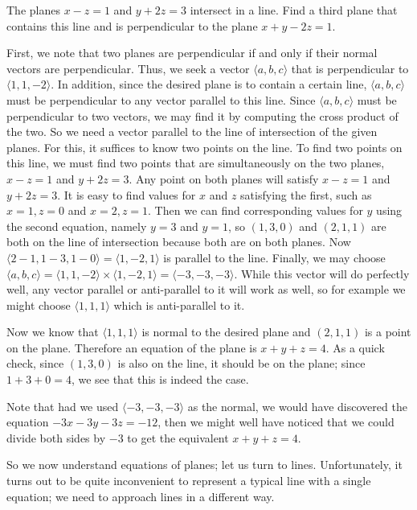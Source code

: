 \begin{example} The planes $x-z=1$ and $y+2z=3$ intersect in a line. Find a
third plane that contains this line and is perpendicular to the plane
$x+y-2z=1$. 

First, we note that two planes are perpendicular if and only if their
normal vectors are perpendicular. Thus, we seek a vector $\langle
a,b,c\rangle$ that is
perpendicular to $\langle 1,1,-2\rangle$. In addition, since the
desired plane is to contain a certain line, $\langle
a,b,c\rangle$ must be perpendicular to any vector parallel to this
line. Since $\langle
a,b,c\rangle$ must be perpendicular to two vectors, we may find it by
computing the cross product of the two. So we need a vector parallel
to the line of intersection of the given planes. For this, it suffices
to know two points on the line. To find two points on this line, we
must find two points that are simultaneously on the two planes, 
$x-z=1$ and $y+2z=3$. Any point on both planes will satisfy 
$x-z=1$ and $y+2z=3$. It is easy to find values for $x$ and $z$
satisfying the first, such as $x=1, z=0$ and $x=2, z=1$. Then
we can find corresponding values for $y$ using the second equation,
namely $y=3$ and $y=1$, so
$(1,3,0)$ and $(2,1,1)$ are both on the line
of intersection because both are on both planes. Now 
$\langle 2-1,1-3,1-0\rangle=\langle 1,-2,1\rangle$ is parallel to the
line. Finally, we may choose $\langle a,b,c\rangle=\langle
1,1,-2\rangle\times \langle 1,-2,1\rangle=\langle -3,-3,-3\rangle$.
While this vector will do perfectly well, any vector parallel or
anti-parallel to it will work as well, so for example we might choose
$\langle 1,1,1\rangle$ which is anti-parallel to it. 

Now we know that $\langle 1,1,1\rangle$ is normal to the desired plane
and $(2,1,1)$ is a point on the plane. Therefore an equation of the
plane is $x+y+z=4$. As a quick check, since $(1,3,0)$ is also on the
line, it should be on the plane; since $1+3+0=4$, we see that this is
indeed the case.

Note that had we used $\langle -3,-3,-3\rangle$ as the normal, we
would have discovered the equation $-3x-3y-3z=-12$, then we might well
have noticed that we could divide both sides by $-3$ to get the
equivalent $x+y+z=4$.
\end{example}

So we now understand equations of planes; let us turn to
lines. Unfortunately, it turns out to be quite inconvenient to
represent a typical line with a single equation; we need to approach
lines in a different way.

